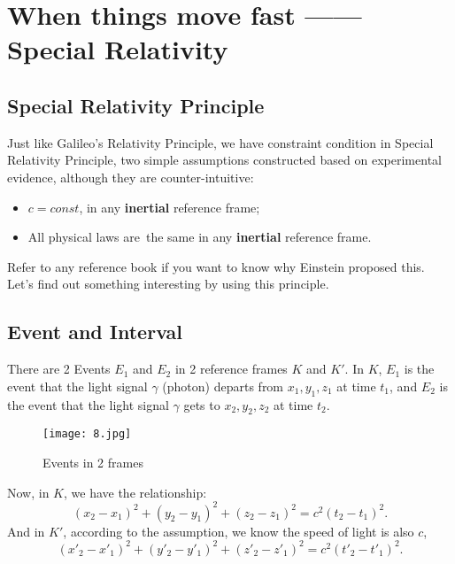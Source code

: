 \documentclass[openany,10pt]{book}
\theoremstyle{definition}
\theoremstyle{definition}
\theoremstyle{remark}
\begin{document}
\chapter{When things move fast ------ Special Relativity}
\section{Special Relativity Principle}
Just like Galileo's Relativity Principle, we have constraint condition in Special Relativity Principle, two simple assumptions constructed based on experimental evidence, although they are counter-intuitive:
\begin{itemize}
    \item $c=const$, in any {\bfseries inertial } reference frame;
    \item All physical laws are\ the same in any  {\bfseries inertial} reference frame.
\end{itemize}


Refer to any reference book if you want to know why Einstein proposed this. Let's find out something interesting by using this principle.

\section{Event and Interval}

There are 2 Events $E_1$ and $E_2$ in 2 reference frames $K$ and $K'$. In $K$, $E_1$ is the event that the light signal $\gamma$ (photon) departs from ${x_1,y_1,z_1}$ at time $t_1$, and $E_2$ is the event that the light signal $\gamma$ gets to ${x_2,y_2,z_2}$ at time $t_2$.\\

\begin{figure}[htbp]
  \centering
    \texttt{[image: 8.jpg]}
 \caption{Events in 2 frames}
\end{figure}

Now, in $K$, we have the relationship:
\begin{equation}
(x_2-x_1)^2+(y_2-y_1)^2+(z_2-z_1)^2=c^2(t_2-t_1)^2.
\end{equation}
And in $K'$, according to the assumption, we know the speed of light is also $c$,
\begin{equation}
(x'_2-x'_1)^2+(y'_2-y'_1)^2+(z'_2-z'_1)^2=c^2(t'_2-t'_1)^2.
\end{equation}
\end{document}
